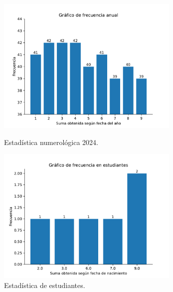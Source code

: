 \documentclass{article}
\begin{document}
	\begin{figure}[htbp]
		\begin{center}
			\includegraphics[width = 0.78\textwidth]{figs/anual.pdf}
			\caption{\label{fig:plot} Estadística numerológica 2024.}
		\end{center}
		\begin{center}
			\includegraphics[width = 0.78\textwidth]{figs/taller.pdf}
			\caption{\label{fig:plot1} Estadística de estudiantes.}
		\end{center}
	\end{figure}
	
\end{document}
